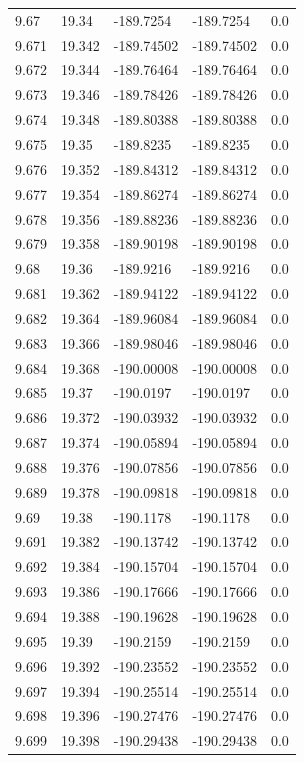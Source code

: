 \begin{tabular}{lllll}
9.67 & 19.34 & -189.7254 & -189.7254 & 0.0 \\
9.671 & 19.342 & -189.74502 & -189.74502 & 0.0 \\
9.672 & 19.344 & -189.76464 & -189.76464 & 0.0 \\
9.673 & 19.346 & -189.78426 & -189.78426 & 0.0 \\
9.674 & 19.348 & -189.80388 & -189.80388 & 0.0 \\
9.675 & 19.35 & -189.8235 & -189.8235 & 0.0 \\
9.676 & 19.352 & -189.84312 & -189.84312 & 0.0 \\
9.677 & 19.354 & -189.86274 & -189.86274 & 0.0 \\
9.678 & 19.356 & -189.88236 & -189.88236 & 0.0 \\
9.679 & 19.358 & -189.90198 & -189.90198 & 0.0 \\
9.68 & 19.36 & -189.9216 & -189.9216 & 0.0 \\
9.681 & 19.362 & -189.94122 & -189.94122 & 0.0 \\
9.682 & 19.364 & -189.96084 & -189.96084 & 0.0 \\
9.683 & 19.366 & -189.98046 & -189.98046 & 0.0 \\
9.684 & 19.368 & -190.00008 & -190.00008 & 0.0 \\
9.685 & 19.37 & -190.0197 & -190.0197 & 0.0 \\
9.686 & 19.372 & -190.03932 & -190.03932 & 0.0 \\
9.687 & 19.374 & -190.05894 & -190.05894 & 0.0 \\
9.688 & 19.376 & -190.07856 & -190.07856 & 0.0 \\
9.689 & 19.378 & -190.09818 & -190.09818 & 0.0 \\
9.69 & 19.38 & -190.1178 & -190.1178 & 0.0 \\
9.691 & 19.382 & -190.13742 & -190.13742 & 0.0 \\
9.692 & 19.384 & -190.15704 & -190.15704 & 0.0 \\
9.693 & 19.386 & -190.17666 & -190.17666 & 0.0 \\
9.694 & 19.388 & -190.19628 & -190.19628 & 0.0 \\
9.695 & 19.39 & -190.2159 & -190.2159 & 0.0 \\
9.696 & 19.392 & -190.23552 & -190.23552 & 0.0 \\
9.697 & 19.394 & -190.25514 & -190.25514 & 0.0 \\
9.698 & 19.396 & -190.27476 & -190.27476 & 0.0 \\
9.699 & 19.398 & -190.29438 & -190.29438 & 0.0 \\

\end{tabular}
